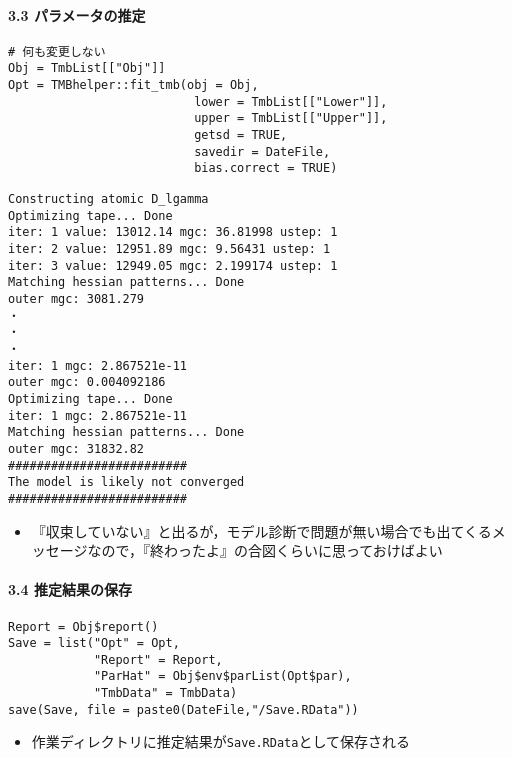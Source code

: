 \documentclass[]{article}
\providecommand{\tightlist}{%
  \setlength{\itemsep}{0pt}\setlength{\parskip}{0pt}}
\let\oldparagraph\paragraph
\renewcommand{\paragraph}[1]{\oldparagraph{#1}\mbox{}}
\begin{document}
\hypertarget{ux30d1ux30e9ux30e1ux30fcux30bfux306eux63a8ux5b9a}{%
\paragraph{3.3
パラメータの推定}\label{ux30d1ux30e9ux30e1ux30fcux30bfux306eux63a8ux5b9a}}

\begin{verbatim}
# 何も変更しない
Obj = TmbList[["Obj"]]
Opt = TMBhelper::fit_tmb(obj = Obj,
                          lower = TmbList[["Lower"]],
                          upper = TmbList[["Upper"]],
                          getsd = TRUE,
                          savedir = DateFile,
                          bias.correct = TRUE)
\end{verbatim}

\begin{verbatim}
Constructing atomic D_lgamma
Optimizing tape... Done
iter: 1 value: 13012.14 mgc: 36.81998 ustep: 1
iter: 2 value: 12951.89 mgc: 9.56431 ustep: 1
iter: 3 value: 12949.05 mgc: 2.199174 ustep: 1
Matching hessian patterns... Done
outer mgc: 3081.279
・
・
・
iter: 1 mgc: 2.867521e-11
outer mgc: 0.004092186
Optimizing tape... Done
iter: 1 mgc: 2.867521e-11
Matching hessian patterns... Done
outer mgc: 31832.82
#########################
The model is likely not converged
#########################
\end{verbatim}

\begin{itemize}
\tightlist
\item
  『収束していない』と出るが，モデル診断で問題が無い場合でも出てくるメッセージなので，『終わったよ』の合図くらいに思っておけばよい
\end{itemize}

\hypertarget{ux63a8ux5b9aux7d50ux679cux306eux4fddux5b58}{%
\paragraph{3.4
推定結果の保存}\label{ux63a8ux5b9aux7d50ux679cux306eux4fddux5b58}}

\begin{verbatim}
Report = Obj$report()
Save = list("Opt" = Opt,
            "Report" = Report,
            "ParHat" = Obj$env$parList(Opt$par),
            "TmbData" = TmbData)
save(Save, file = paste0(DateFile,"/Save.RData"))
\end{verbatim}

\begin{itemize}
\tightlist
\item
  作業ディレクトリに推定結果が\texttt{Save.RData}として保存される 
\end{itemize}
\end{document}
